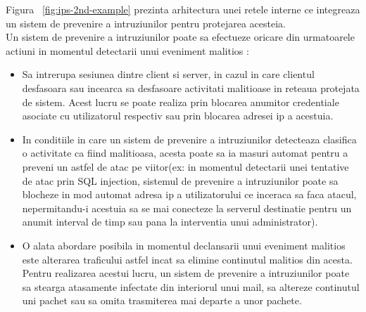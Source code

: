 Figura ~\ref{fig:ips-2nd-example} prezinta arhitectura unei retele interne ce integreaza un sistem de prevenire a intruziunilor pentru protejarea acesteia. \\
Un sistem de prevenire a intruziunilor poate sa efectueze oricare din urmatoarele actiuni in momentul detectarii unui eveniment malitios \cite{ips_fire}:
\begin{itemize}
	\item Sa intrerupa sesiunea dintre client si server, in cazul in care clientul desfasoara sau incearca sa desfasoare activitati malitioase in reteaua protejata de sistem. Acest lucru se poate realiza prin blocarea anumitor credentiale asociate cu utilizatorul respectiv sau prin blocarea adresei ip a acestuia.
	\item In conditiile in care un sistem de prevenire a intruziunilor detecteaza clasifica o activitate ca fiind malitioasa, acesta poate sa ia masuri automat pentru a preveni un astfel de atac pe viitor(ex: in momentul detectarii unei tentative de atac prin SQL injection, sistemul de prevenire a intruziunilor poate sa blocheze in mod automat adresa ip a utilizatorului ce inceraca sa faca atacul, nepermitandu-i acestuia sa se mai conecteze la serverul destinatie pentru un anumit interval de timp sau pana la interventia unui administrator).
	\item O alata abordare posibila in momentul declansarii unui eveniment malitios este alterarea traficului astfel incat sa elimine continutul malitios din acesta. Pentru realizarea acestui lucru, un sistem de prevenire a intruziunilor poate sa stearga atasamente infectate din interiorul unui mail, sa altereze continutul uni pachet sau sa omita trasmiterea mai departe a unor pachete.
	
\end{itemize}

